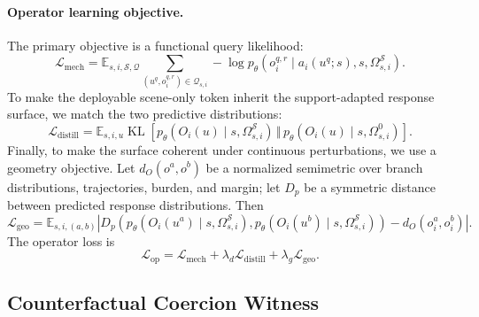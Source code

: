 \documentclass[10pt]{article}
\newcommand{\E}{\mathbb{E}}
\newcommand{\cQ}{\mathcal{Q}}
\newcommand{\cS}{\mathcal{S}}
\begin{document}
\paragraph{Operator learning objective.}
The primary objective is a functional query likelihood:
\begin{equation}
    \mathcal L_{\mathrm{mech}}
    =
    \E_{s,i,\cS,\cQ}
    \sum_{(u^q,o_i^{q,r})\in\cQ_{s,i}}
    -
    \log
    p_\theta
    \left(
    o_i^{q,r}
    \mid
    a_i(u^q;s),s,\Omega_{s,i}^{\cS}
    \right).
    \label{eq:mechanism_likelihood}
\end{equation}
To make the deployable scene-only token inherit the support-adapted response surface, we match the two predictive distributions:
\begin{equation}
    \mathcal L_{\mathrm{distill}}
    =
    \E_{s,i,u}
    \operatorname{KL}
    \left[
    p_\theta(O_i(u)\mid s,\Omega_{s,i}^{\cS})
    \,\Vert\,
    p_\theta(O_i(u)\mid s,\Omega_{s,i}^{0})
    \right].
    \label{eq:distillation_loss}
\end{equation}
Finally, to make the surface coherent under continuous perturbations, we use a geometry objective. Let \(d_O(o^a,o^b)\) be a normalized semimetric over branch distributions, trajectories, burden, and margin; let \(D_p\) be a symmetric distance between predicted response distributions. Then
\begin{equation}
    \mathcal L_{\mathrm{geo}}
    =
    \E_{s,i,(a,b)}
    \left|
    D_p
    \left(
    p_\theta(O_i(u^a)\mid s,\Omega_{s,i}^{\cS}),
    p_\theta(O_i(u^b)\mid s,\Omega_{s,i}^{\cS})
    \right)
    -
    d_O(o_i^a,o_i^b)
    \right|.
    \label{eq:geometry_loss}
\end{equation}
The operator loss is
\begin{equation}
    \mathcal L_{\mathrm{op}}
    =
    \mathcal L_{\mathrm{mech}}
    +
    \lambda_d\mathcal L_{\mathrm{distill}}
    +
    \lambda_g\mathcal L_{\mathrm{geo}}.
    \label{eq:operator_loss}
\end{equation}

\subsection{Counterfactual Coercion Witness}
\label{sec:method_coercion_witness}
\end{document}
